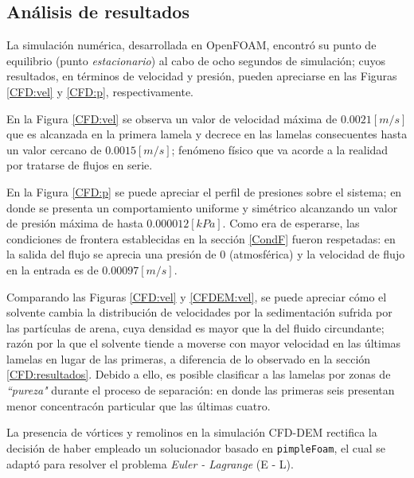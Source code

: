 \begin{center}
	\section{An\'alisis de resultados}
\end{center}

\noindent
\justify

La simulaci\'on num\'erica, desarrollada en OpenFOAM, encontr\'o su punto de equilibrio (punto \textit{estacionario}) al cabo de ocho segundos de simulaci\'on; cuyos resultados, en t\'erminos de velocidad y presi\'on, pueden apreciarse en las Figuras \ref{CFD:vel} y \ref{CFD:p}, respectivamente.

\noindent
\justify

En la Figura \ref{CFD:vel} se observa un valor de velocidad m\'axima de $0.0021 [m/s]$ que es alcanzada en la primera lamela y decrece en las lamelas consecuentes hasta un valor cercano de $0.0015 [m/s]$; fen\'omeno f\'isico que va acorde a la realidad por tratarse de flujos en serie.

\noindent
\justify

En la Figura \ref{CFD:p} se puede apreciar el perfil de presiones sobre el sistema; en donde se presenta un comportamiento uniforme y sim\'etrico alcanzando un valor de presi\'on m\'axima de hasta $0.000012 [kPa]$. Como era de esperarse, las condiciones de frontera establecidas en la secci\'on \ref{CondF} fueron respetadas: en la salida del flujo se aprecia una presi\'on de $0$ (atmosf\'erica) y la velocidad de flujo en la entrada es de $0.00097 [m/s]$.

\noindent
\justify

Comparando las Figuras \ref{CFD:vel} y \ref{CFDEM:vel}, se puede apreciar c\'omo el solvente cambia la distribuci\'on de velocidades por la sedimentaci\'on sufrida por las part\'iculas de arena, cuya densidad es mayor que la del fluido circundante; raz\'on por la que el solvente tiende a moverse con mayor velocidad en las \'ultimas lamelas en lugar de las primeras, a diferencia de lo observado en la secci\'on \ref{CFD:resultados}. Debido a ello, es posible clasificar a las lamelas por zonas de \textit{``pureza"} durante el proceso de separaci\'on: en donde las primeras seis presentan menor concentrac\'on particular que las \'ultimas cuatro.

\noindent
\justify

La presencia de v\'ortices y remolinos en la simulaci\'on CFD-DEM rectifica la decisi\'on de haber empleado un solucionador basado en \texttt{pimpleFoam}, el cual se adapt\'o para resolver el problema \textit{Euler - Lagrange} (E - L).

